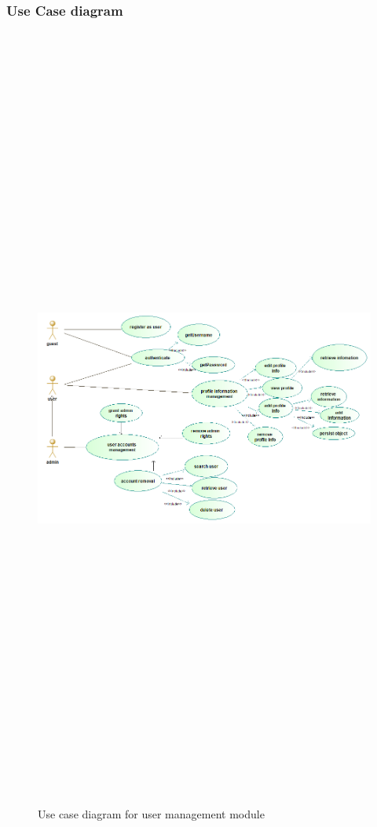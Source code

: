 \subsubsection{Use Case diagram}
\begin{figure}[H]
	\includegraphics[width=12cm,height=26cm,keepaspectratio]{Users/Pictures/user_use_case_diagram.png}
	\caption{Use case diagram for user management module}\label{visina8}
\end{figure}
